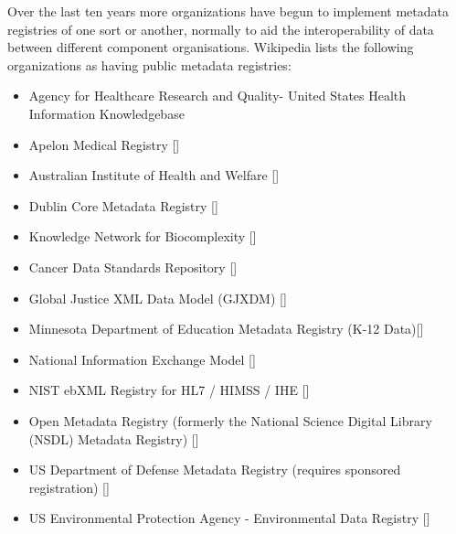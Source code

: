 \documentclass{article}
\begin{document}
Over the last ten years more organizations have begun to implement metadata registries of one sort or another, normally to aid the interoperability of data between different component organisations. Wikipedia lists the following  organizations as having public metadata registries:

\begin{itemize}
\item Agency for Healthcare Research and Quality- United States Health Information Knowledgebase \cite{AgHealth}
\item Apelon Medical Registry []
\item Australian Institute of Health and Welfare []
\item Dublin Core Metadata Registry []
\item Knowledge Network for Biocomplexity []
\item Cancer Data Standards Repository []
\item Global Justice XML Data Model (GJXDM) []
\item Minnesota Department of Education Metadata Registry (K-12 Data)[]
\item National Information Exchange Model []
\item NIST ebXML Registry for HL7 / HIMSS / IHE []
\item Open Metadata Registry (formerly the National Science Digital Library (NSDL) Metadata Registry) []
\item US Department of Defense Metadata Registry (requires sponsored registration) []
\item US Environmental Protection Agency - Environmental Data Registry []
\end{itemize}


\newpage




\end{document}
